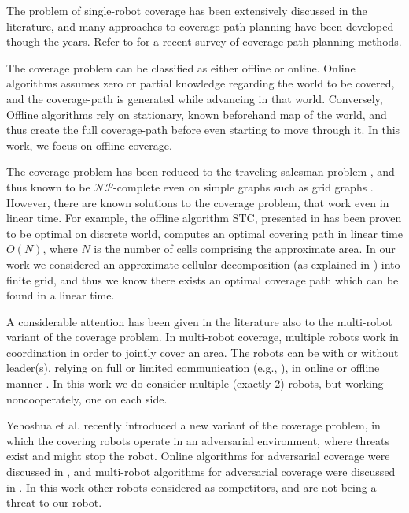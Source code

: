 The problem of single-robot coverage has been extensively discussed in the literature, and many approaches to coverage path planning have been developed though the years. Refer to \cite{galceran2013survey} for a recent survey of coverage path planning methods.

The coverage problem can be classified as either offline or online. 
Online algorithms assumes zero or partial knowledge regarding the world to be covered, and the coverage-path is generated while advancing in that world. Conversely, Offline algorithms rely on stationary, known beforehand map of the world, and thus create the full coverage-path before even starting to move through it. In this work, we focus on offline coverage.

The coverage problem has been reduced to the traveling salesman problem \cite{arkin2000approximation}, and thus known to be $\mathcal{NP}$-complete even on simple graphs such as grid graphs \cite{papadimitriou1977euclidean}. However, there are known solutions to the coverage problem, that work even in linear time. For example, the offline algorithm STC, presented in \cite{gabriely2001spanning} has been proven to be optimal on discrete world, computes an optimal covering path in linear time $O(N)$, where $N$ is the number of cells comprising the approximate area. In our work we considered an approximate cellular decomposition (as explained in \cite{galceran2013survey}) into finite grid, and thus we know there exists an optimal coverage path which can be found in a linear time.

A considerable attention has been given in the literature also to the multi-robot variant of the coverage problem. In multi-robot coverage, multiple robots work in coordination in order to jointly cover an area. The robots can be with or without leader(s), relying on full or limited communication (e.g., \cite{agmon2008giving}), in online or offline manner \cite{agmon2008giving, de2005blind}.
In this work we do consider multiple (exactly 2) robots, but working noncooperately, one on each side.

Yehoshua et al. \cite{yehoshua2013robotic} recently introduced a new variant of the coverage problem, in which the covering robots operate in an adversarial environment, where threats exist and might stop the robot. Online algorithms for adversarial coverage were discussed in  \cite{yehoshua2015online}, and multi-robot algorithms for adversarial coverage were discussed in \cite{yehoshua2016multi}.
In this work other robots considered as competitors, and are not being a threat to our robot.

